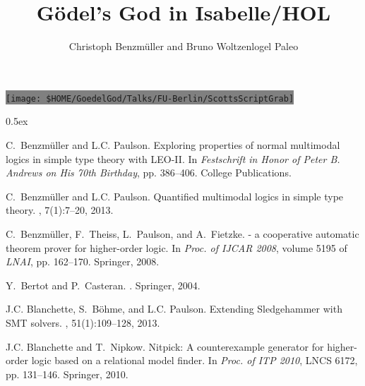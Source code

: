 \documentclass[11pt,a4paper]{article}
\begin{document}
\title{G\"odel's God in Isabelle/HOL}
\author{Christoph Benzm\"uller and Bruno Woltzenlogel Paleo}
\maketitle

\noindent\colorbox{gray}{\texttt{[image: \$HOME/GoedelGod/Talks/FU-Berlin/ScottsScriptGrab]}} %



\parindent 0pt\parskip 0.5ex



%
%

\small
\begin{thebibliography}{10}

C.~Benzm{\"u}ller and L.C. Paulson.
\newblock Exploring properties of normal multimodal logics in simple type
  theory with {LEO-II}.
\newblock In {\em {Festschrift in Honor of {Peter B. Andrews} on His 70th
  Birthday}}, pp. 386--406. College Publications.

C.~Benzm{\"u}ller and L.C. Paulson.
\newblock Quantified multimodal logics in simple type theory.
,
  7(1):7--20, 2013.

C.~Benzm{\"u}ller, F.~Theiss, L.~Paulson, and A.~Fietzke.
 - a cooperative automatic theorem prover for higher-order
  logic.
\newblock In {\em Proc. of IJCAR 2008}, volume 5195 of {\em LNAI}, pp.
  162--170. Springer, 2008.

Y.~Bertot and P.~Casteran.
.
\newblock Springer, 2004.

J.C. Blanchette, S.~B\"ohme, and L.C. Paulson.
\newblock Extending {Sledgehammer} with {SMT} solvers.
, 51(1):109--128, 2013.

J.C. Blanchette and T.~Nipkow.
\newblock Nitpick: A counterexample generator for higher-order logic based on a
  relational model finder.
\newblock In {\em Proc. of ITP 2010}, LNCS 6172, pp. 131--146.
  Springer, 2010.



\end{thebibliography}
\end{document}
